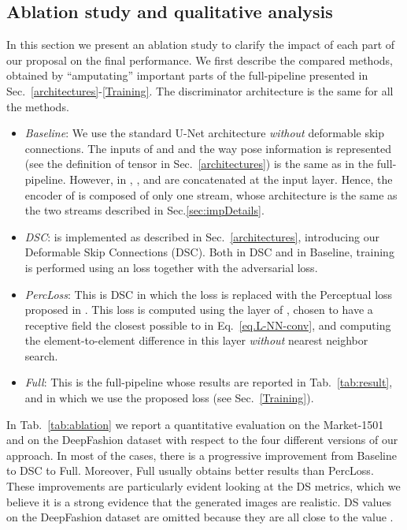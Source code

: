 \documentclass[10pt,twocolumn,letterpaper]{article}
\begin{document}
\subsection{Ablation study and qualitative analysis}
\label{Ablation}
In this section we present  an ablation study to clarify the impact of each part of our proposal on the final performance. We first describe the compared methods, obtained by ``amputating'' important parts of the full-pipeline presented in Sec.~\ref{architectures}-\ref{Training}. The discriminator architecture is the same for all the methods. 

\begin{itemize}
\item \emph{Baseline}:  We use the standard U-Net architecture  \cite{pix2pix2016} {\em without} deformable skip connections. The inputs of  and  and the way pose information is represented (see the definition of tensor  in Sec.~\ref{architectures}) is the same as in 
the full-pipeline. However, in , ,  and  are
 concatenated at the input layer. Hence,
 the encoder of  is  composed of only one stream, whose architecture is the same as the two streams  described in Sec.\ref{sec:impDetails}. 

\item \emph{DSC}:  is implemented as described in Sec.~\ref{architectures}, introducing our Deformable Skip Connections (DSC). Both in DSC and in Baseline, training is performed using an  loss together with the adversarial loss.

\item
\emph{PercLoss}: This is DSC in which the  loss is replaced with the Perceptual loss proposed in \cite{DBLP:conf/eccv/JohnsonAF16}. 
This loss is computed using the layer  of \cite{DBLP:journals/corr/SimonyanZ14a}, chosen to have a receptive field the closest possible to  in Eq.~\ref{eq.L-NN-conv}, and computing the element-to-element difference in this layer  {\em without} nearest neighbor search. 



\item \emph{Full}: This is the full-pipeline whose results are reported in Tab.~\ref{tab:result}, and in which we use the proposed  loss (see Sec.~\ref{Training}).
\end{itemize}

In Tab.~\ref{tab:ablation} we report a quantitative evaluation on the Market-1501 and on the DeepFashion dataset with respect to the four different versions of our approach. 
In most of the cases, there is a   progressive improvement  from  Baseline to  DSC to Full. Moreover, Full usually obtains better results than 
PercLoss. These improvements are particularly evident looking at the DS metrics, which we believe it is a strong evidence that the generated images are realistic.  
 DS values on the DeepFashion dataset are omitted because they are all close to the value . 
\end{document}
